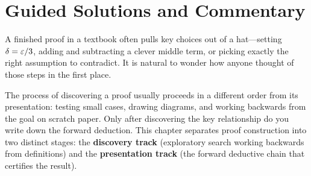 \section{Guided Solutions and Commentary}
\chapterline

A finished proof in a textbook often pulls key choices out of a hat---setting $\delta = \varepsilon/3$, adding and subtracting a clever middle term, or picking exactly the right assumption to contradict. It is natural to wonder how anyone thought of those steps in the first place.

The process of discovering a proof usually proceeds in a different order from its presentation: testing small cases, drawing diagrams, and working backwards from the goal on scratch paper. Only after discovering the key relationship do you write down the forward deduction. This chapter separates proof construction into two distinct stages: the \textbf{discovery track} (exploratory search working backwards from definitions) and the \textbf{presentation track} (the forward deductive chain that certifies the result).

